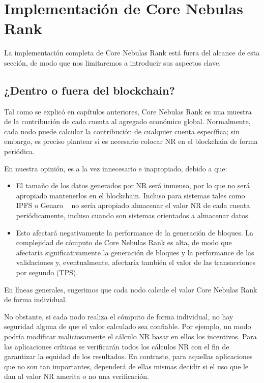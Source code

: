
\section{Implementación de Core Nebulas Rank}
La implementación completa de Core Nebulas Rank está fuera del alcance de esta sección, de modo que nos limitaremos a introducir sus aspectos clave.

\subsection{¿Dentro o fuera del blockchain? \label{sec:onchain}}
Tal como se explicó en capítulos anteriores, Core Nebulas Rank es una muestra de la contribución de cada cuenta al agregado económico global. Normalmente, cada nodo puede calcular la contribución de cualquier cuenta específica; sin embargo, es preciso plantear si es necesario colocar NR en el blockchain de forma periódica.

En nuestra opinión, es a la vez innecesario e inapropiado, debido a que:
\begin{itemize}
\item El tamaño de los datos generados por NR será inmenso, por lo que no será apropiado mantenerlos en el blockchain. Incluso para sistemas tales como IPFS o Genaro \cite{IPFS}~\cite{Genaro} no sería apropiado almacenar el valor NR de cada cuenta periódicamente, incluso cuando son sistemas orientados a almacenar datos.
\item Esto afectará negativamente la performance de la generación de bloques. La complejidad de cómputo de Core Nebulas Rank es alta, de modo que afectaría significativamente la generación de bloques y la performance de las validaciones y, eventualmente, afectaría también el valor de las transacciones por segundo (TPS).
\end{itemize}
\noindent En líneas generales, sugerimos que cada nodo calcule el valor Core Nebulas Rank de forma individual.

No obstante, si cada nodo realiza el cómputo de forma individual, no hay seguridad alguna de que el valor calculado sea confiable. Por ejemplo, un modo podría modificar maliciosamente el cálculo NR basar en ellos los incentivos. Para las aplicaciones críticas se verificarán todos los cálculos NR con el fin de garantizar la equidad de los resultados. En contraste, para aquellas aplicaciones que no son tan importantes, dependerá de ellas mismas decidir si el uso que le dan al valor NR amerita o no una verificación.

